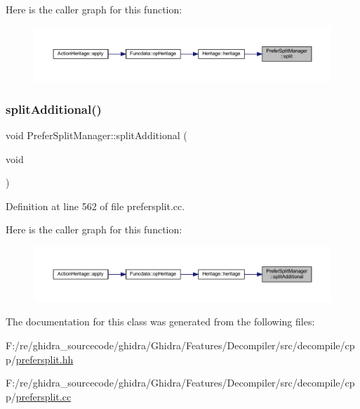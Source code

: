 Here is the caller graph for this function\+:
\nopagebreak
\begin{figure}[H]
\begin{center}
\leavevmode
\includegraphics[width=350pt]{class_prefer_split_manager_ac57104c8f58add45abec3119b2e89fee_icgraph}
\end{center}
\end{figure}
\mbox{\label{class_prefer_split_manager_a9b4943224f9764638eca4789f834913a}} 
\subsubsection{\texorpdfstring{splitAdditional()}{splitAdditional()}}
{\footnotesize\ttfamily void Prefer\+Split\+Manager\+::split\+Additional (\begin{DoxyParamCaption}\item[{void}]{ }\end{DoxyParamCaption})}



Definition at line 562 of file prefersplit.\+cc.

Here is the caller graph for this function\+:
\nopagebreak
\begin{figure}[H]
\begin{center}
\leavevmode
\includegraphics[width=350pt]{class_prefer_split_manager_a9b4943224f9764638eca4789f834913a_icgraph}
\end{center}
\end{figure}


The documentation for this class was generated from the following files\+:\begin{DoxyCompactItemize}
\item 
F\+:/re/ghidra\+\_\+sourcecode/ghidra/\+Ghidra/\+Features/\+Decompiler/src/decompile/cpp/\mbox{\hyperlink{prefersplit_8hh}{prefersplit.\+hh}}\item 
F\+:/re/ghidra\+\_\+sourcecode/ghidra/\+Ghidra/\+Features/\+Decompiler/src/decompile/cpp/\mbox{\hyperlink{prefersplit_8cc}{prefersplit.\+cc}}\end{DoxyCompactItemize}
